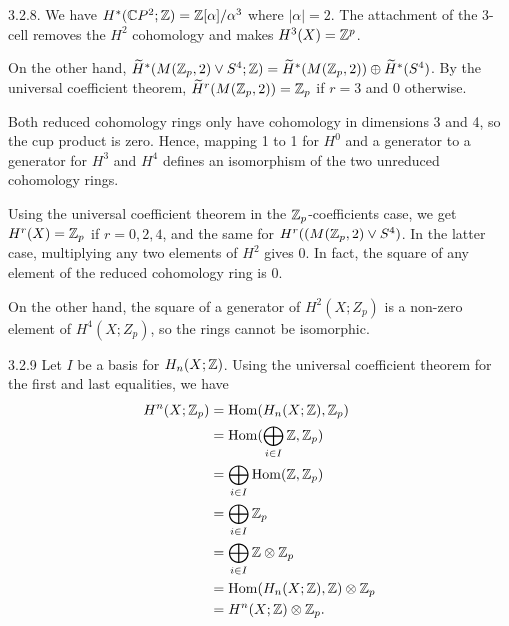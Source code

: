 \documentclass{article}
\begin{document}
 3.2.8. We have $H^*(\mathbb{C} P^2; \mathbb{Z}) = \mathbb{Z}[\alpha]/\alpha^3$ where $|\alpha| = 2$.
The attachment of the 3-cell removes the $H^2$ cohomology and makes $H^3(X) = \mathbb{Z}^p$.

On the other hand, $\widetilde H^*(M(\mathbb{Z}_p, 2) \vee S^4; \mathbb{Z}) = \widetilde H^*(M(\mathbb{Z}_p, 2)) \oplus \widetilde H^*(S^4)$.  By the universal coefficient theorem, $\widetilde H^r(M(\mathbb{Z}_p, 2)) = \mathbb{Z}_p$ if $r = 3$ and $0$ otherwise.

Both reduced cohomology rings only have cohomology in dimensions 3 and 4, so the cup product is zero.  Hence, mapping 1 to 1 for $H^0$ and a generator to a generator for $H^3$ and $H^4$ defines an isomorphism of the two unreduced cohomology rings.

Using the universal coefficient theorem in the $\mathbb{Z}_p$-coefficients case, we get 
$H^r(X) = \mathbb{Z}_p$ if $r = 0,2,4$, and the same for $H^r((M(\mathbb{Z}_p, 2) \vee S^4)$.  In the latter case, multiplying any two elements of $H^2$ gives $0$. In fact, the square of any element of the reduced cohomology ring is $0$.

On the other hand, the square of a generator of $H^2(X;Z_p)$ is a non-zero element of $H^4(X;Z_p)$, so the rings cannot be isomorphic.

 3.2.9 Let $I$ be a basis for $H_n(X; \mathbb{Z})$. Using the universal coefficient theorem for the first and last equalities, we have
\begin{align*}
H^n(X; \mathbb{Z}_p) & = \operatorname{Hom}(H_n(X; \mathbb{Z}), \mathbb{Z}_p) \\
& = \operatorname{Hom}(\bigoplus_{i \in I} \mathbb{Z}, \mathbb{Z}_p) \\
& = \bigoplus_{i \in I} \operatorname{Hom}(\mathbb{Z}, \mathbb{Z}_p) \\
& = \bigoplus_{i \in I} \mathbb{Z}_p \\
& = \bigoplus_{i \in I} \mathbb{Z} \otimes \mathbb{Z}_p \\
& = \operatorname{Hom}(H_n(X; \mathbb{Z}), \mathbb{Z}) \otimes \mathbb{Z}_p \\
& = H^n(X; \mathbb{Z}) \otimes \mathbb{Z}_p.
\end{align*}
\end{document}
